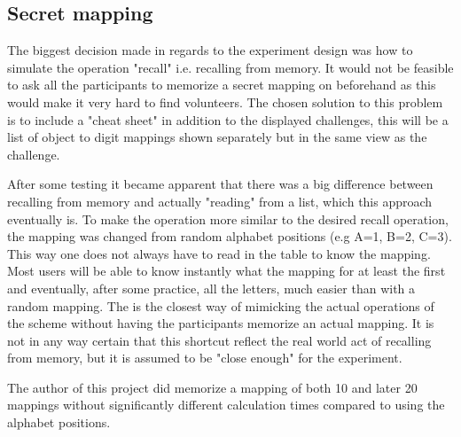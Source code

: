 \subsection{Secret mapping} The biggest decision made in regards to the experiment design was how to simulate the operation "recall" i.e. recalling from memory. It would not be feasible to ask all the participants to memorize a secret mapping on beforehand as this would make it very hard to find volunteers. The chosen solution to this problem is to include a "cheat sheet" in addition to the displayed challenges, this will be a list of object to digit mappings shown separately but in the same view as the challenge.
\par After some testing it became apparent that there was a big difference between recalling from memory and actually "reading" from a list, which this approach eventually is. To make the operation more similar to the desired recall operation, the mapping was changed from random alphabet positions (e.g A=1, B=2, C=3). This way one does not always have to read in the table to know the mapping. Most users will be able to know instantly what the mapping for at least the first and eventually, after some practice, all the letters, much easier than with a random mapping. The is the closest way of mimicking the actual operations of the scheme without having the participants memorize an actual mapping. It is not in any way certain that this shortcut reflect the real world act of recalling from memory, but it is assumed to be "close enough" for the experiment. 
\begin{remark}
The author of this project did memorize a mapping of both 10 and later 20 mappings without significantly different calculation times compared to using the alphabet positions.
\end{remark}

